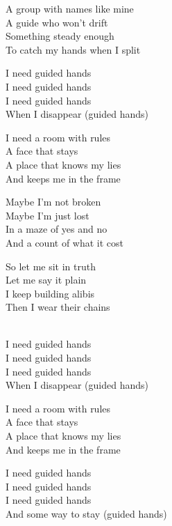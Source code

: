 \begin{lyrics}
A group with names like mine\\
A guide who won't drift\\
Something steady enough\\
To catch my hands when I split

I need guided hands\\
I need guided hands\\
I need guided hands\\
When I disappear (guided hands)

I need a room with rules\\
A face that stays\\
A place that knows my lies\\
And keeps me in the frame

Maybe I'm not broken\\
Maybe I'm just lost\\
In a maze of yes and no\\
And a count of what it cost

So let me sit in truth\\
Let me say it plain\\
I keep building alibis\\
Then I wear their chains

\\
I need guided hands\\
I need guided hands\\
I need guided hands\\
When I disappear (guided hands)

I need a room with rules\\
A face that stays\\
A place that knows my lies\\
And keeps me in the frame

I need guided hands\\
I need guided hands\\
I need guided hands\\
And some way to stay (guided hands)

\end{lyrics}

